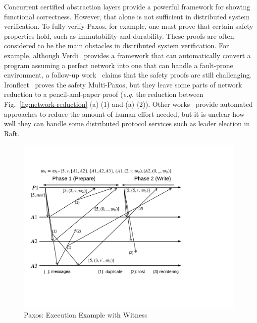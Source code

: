Concurrent certified abstraction layers provide a powerful framework for showing functional correctness.
However, that alone is not sufficient in distributed system verification.
To fully verify Paxos, for example, one must prove that certain safety properties hold, such as immutability and durability.
These proofs are often considered to be the main obstacles in distributed system verification.
For example, although Verdi~\cite{verdi} provides a framework
that can automatically convert a program assuming a perfect network
into one that can handle a fault-prone environment,
a follow-up work~\cite{cppraft} claims that the safety proofs are still challenging.
Ironfleet~\cite{ironfleet} proves the safety Multi-Paxos,
but they leave some parts of network reduction to a pencil-and-paper proof
(\textit{e.g.} the reduction between Fig.~\ref{fig:network-reduction} (a) (1) and (a) (2)).
Other works~\cite{EPRdistributed, modular} provide automated approaches to reduce the amount of human effort needed,
but it is unclear how well they can handle some distributed protocol services such as leader election in Raft.

\begin{figure}
\begin{center}
\includegraphics[scale=.34]{figs/multipaxos/paxos_example_witness}
\end{center}
\caption{Paxos: Execution Example with Witness}
\label{fig:paxos-example-with-witness}
\end{figure}

